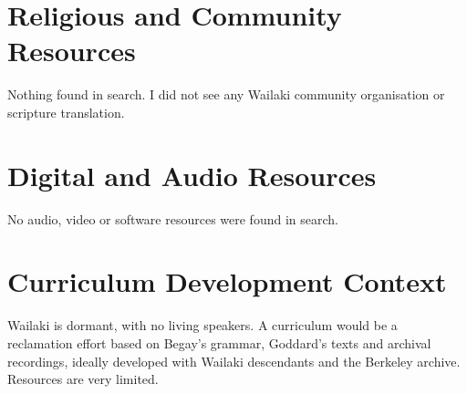 \documentclass[12pt]{article}
\begin{document}
\section{Religious and Community Resources}
Nothing found in search. I did not see any Wailaki community organisation or scripture translation.

\section{Digital and Audio Resources}
No audio, video or software resources were found in search.

\section{Curriculum Development Context}
Wailaki is dormant, with no living speakers. A curriculum would be a reclamation effort based on Begay's grammar, Goddard's texts and archival recordings, ideally developed with Wailaki descendants and the Berkeley archive. Resources are very limited.
\end{document}
